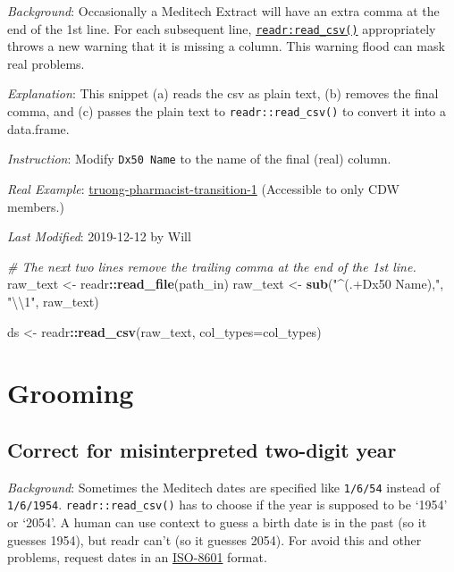\documentclass[
]{book}
\newenvironment{Shaded}{\begin{snugshade}}{\end{snugshade}}
\newcommand{\CharTok}[1]{\textcolor[rgb]{0.31,0.60,0.02}{#1}}
\newcommand{\CommentTok}[1]{\textcolor[rgb]{0.56,0.35,0.01}{\textit{#1}}}
\newcommand{\DataTypeTok}[1]{\textcolor[rgb]{0.13,0.29,0.53}{#1}}
\newcommand{\KeywordTok}[1]{\textcolor[rgb]{0.13,0.29,0.53}{\textbf{#1}}}
\newcommand{\NormalTok}[1]{#1}
\newcommand{\OperatorTok}[1]{\textcolor[rgb]{0.81,0.36,0.00}{\textbf{#1}}}
\newcommand{\StringTok}[1]{\textcolor[rgb]{0.31,0.60,0.02}{#1}}
\begin{document}
\emph{Background}: Occasionally a Meditech Extract will have an extra comma at the end of the 1st line. For each subsequent line, \href{https://readr.tidyverse.org/reference/read_delim.html}{\texttt{readr:read\_csv()}} appropriately throws a new warning that it is missing a column. This warning flood can mask real problems.

\emph{Explanation}: This snippet (a) reads the csv as plain text, (b) removes the final comma, and (c) passes the plain text to \texttt{readr::read\_csv()} to convert it into a data.frame.

\emph{Instruction}: Modify \texttt{Dx50\ Name} to the name of the final (real) column.

\emph{Real Example}: \href{https://github.com/OuhscBbmc/truong-pharmacist-transition-1/blob/eec6d7eb8aaa9e3df52dafb826dbc53aaf515c63/manipulation/ellis/dx-ellis.R\#L158-L162}{truong-pharmacist-transition-1} (Accessible to only CDW members.)

\emph{Last Modified}: 2019-12-12 by Will

\begin{Shaded}
\begin{Highlighting}[]
\CommentTok{\# The next two lines remove the trailing comma at the end of the 1st line.}
\NormalTok{raw\_text  <{-}}\StringTok{ }\NormalTok{readr}\OperatorTok{::}\KeywordTok{read\_file}\NormalTok{(path\_in)}
\NormalTok{raw\_text  <{-}}\StringTok{ }\KeywordTok{sub}\NormalTok{(}\StringTok{"\^{}(.+Dx50 Name),"}\NormalTok{, }\StringTok{"}\CharTok{\textbackslash{}\textbackslash{}}\StringTok{1"}\NormalTok{, raw\_text)}

\NormalTok{ds        <{-}}\StringTok{ }\NormalTok{readr}\OperatorTok{::}\KeywordTok{read\_csv}\NormalTok{(raw\_text, }\DataTypeTok{col\_types=}\NormalTok{col\_types)}
\end{Highlighting}
\end{Shaded}

\hypertarget{snippets-grooming}{%
\section{Grooming}\label{snippets-grooming}}

\hypertarget{snippets-grooming-two-year}{%
\subsection{Correct for misinterpreted two-digit year}\label{snippets-grooming-two-year}}

\emph{Background}: Sometimes the Meditech dates are specified like \texttt{1/6/54} instead of \texttt{1/6/1954}. \texttt{readr::read\_csv()} has to choose if the year is supposed to be `1954' or `2054'. A human can use context to guess a birth date is in the past (so it guesses 1954), but readr can't (so it guesses 2054). For avoid this and other problems, request dates in an \href{https://www.explainxkcd.com/wiki/index.php/1179:_ISO_8601}{ISO-8601} format.
\end{document}
